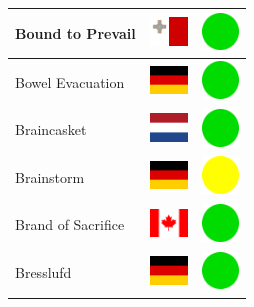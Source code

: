 \documentclass[12pt, a4paper, twoside]{report}
\begin{document}
\begin{center}
\begin{longtable}{|p{5cm}|p{2cm}|p{2cm}|}
Bound to Prevail & \includegraphics[width=1cm]{4x3/mt} & \includegraphics[width=1cm]{likes/y} \\ \hline
Bowel Evacuation & \includegraphics[width=1cm]{4x3/de} & \includegraphics[width=1cm]{likes/y} \\ \hline
Braincasket & \includegraphics[width=1cm]{4x3/nl} & \includegraphics[width=1cm]{likes/y} \\ \hline
Brainstorm & \includegraphics[width=1cm]{4x3/de} & \includegraphics[width=1cm]{likes/m} \\ \hline
Brand of Sacrifice & \includegraphics[width=1cm]{4x3/ca} & \includegraphics[width=1cm]{likes/y} \\ \hline
Bresslufd & \includegraphics[width=1cm]{4x3/de} & \includegraphics[width=1cm]{likes/y} \\ \hline

\end{longtable}
\end{center}
\end{document}
